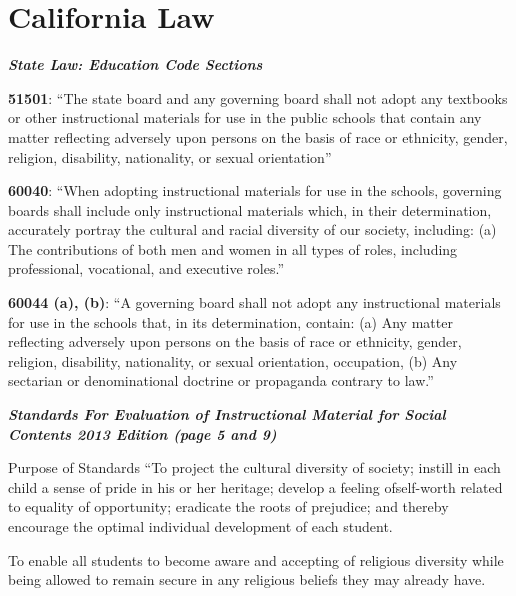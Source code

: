 \chapter{California Law}

\textit{\textbf{State Law: Education Code Sections}}

\noindent
\textbf{51501}: “The state board and any governing board shall not adopt any textbooks or other instructional materials for use in the public schools that contain any matter reflecting adversely upon persons on the basis of race or ethnicity, gender, religion, disability, nationality, or sexual orientation”

\textbf{60040}: “When adopting instructional materials for use in the schools, governing boards shall include only instructional materials which, in their determination, accurately portray the cultural and racial diversity of our society, including: (a) The contributions of both men and women in all types of roles, including professional, vocational, and executive roles.”

\textbf{60044 (a), (b)}: “A governing board shall not adopt any instructional materials for use in the schools that, in its determination, contain: (a) Any matter reflecting adversely upon persons on the basis of race or ethnicity, gender, religion, disability, nationality, or sexual orientation, occupation, (b) Any sectarian or denominational doctrine or propaganda contrary to law.”

\noindent
\textit{\textbf{Standards For Evaluation of Instructional Material for Social Contents 2013 Edition (page 5 and 9)}}

\noindent
Purpose of Standards “To project the cultural diversity of society; instill in each child a sense of pride in his or her heritage; develop a feeling of\break self-worth related to equality of opportunity; eradicate the roots of prejudice; and thereby encourage the optimal individual development of each student.

To enable all students to become aware and accepting of religious diversity while being allowed to remain secure in any religious beliefs they may already have.

